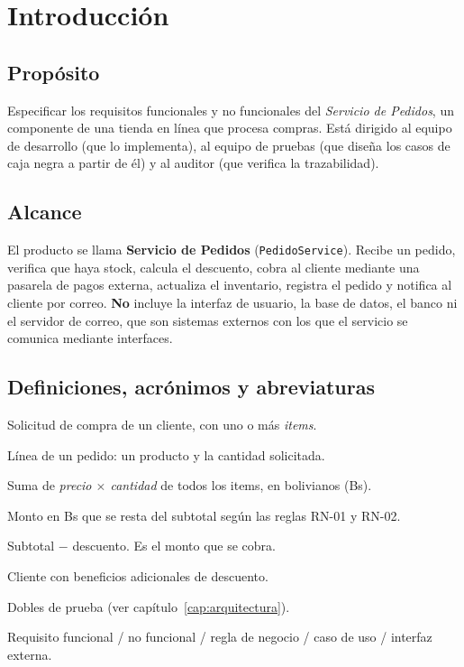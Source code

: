 \documentclass[11pt,a4paper,oneside]{report}
\newcommand{\code}[1]{\texttt{#1}}
\begin{document}
\section{Introducción}
\subsection{Propósito}
Especificar los requisitos funcionales y no funcionales del \emph{Servicio de Pedidos}, un componente de una tienda en línea que procesa compras. Está dirigido al equipo de desarrollo (que lo implementa), al equipo de pruebas (que diseña los casos de caja negra a partir de él) y al auditor (que verifica la trazabilidad).

\subsection{Alcance}
El producto se llama \textbf{Servicio de Pedidos} (\code{PedidoService}). Recibe un pedido, verifica que haya stock, calcula el descuento, cobra al cliente mediante una pasarela de pagos externa, actualiza el inventario, registra el pedido y notifica al cliente por correo. \textbf{No} incluye la interfaz de usuario, la base de datos, el banco ni el servidor de correo, que son sistemas externos con los que el servicio se comunica mediante interfaces.

\subsection{Definiciones, acrónimos y abreviaturas}
\begin{description}[itemsep=0pt]
  \item[Pedido] Solicitud de compra de un cliente, con uno o más \emph{items}.
  \item[Item] Línea de un pedido: un producto y la cantidad solicitada.
  \item[Subtotal] Suma de \emph{precio $\times$ cantidad} de todos los items, en bolivianos (Bs).
  \item[Descuento] Monto en Bs que se resta del subtotal según las reglas RN-01 y RN-02.
  \item[Total] Subtotal $-$ descuento. Es el monto que se cobra.
  \item[Cliente VIP] Cliente con beneficios adicionales de descuento.
  \item[Stub / Mock] Dobles de prueba (ver capítulo~\ref{cap:arquitectura}).
  \item[RF / RNF / RN / CU / IE] Requisito funcional / no funcional / regla de negocio / caso de uso / interfaz externa.
\end{description}
\end{document}
